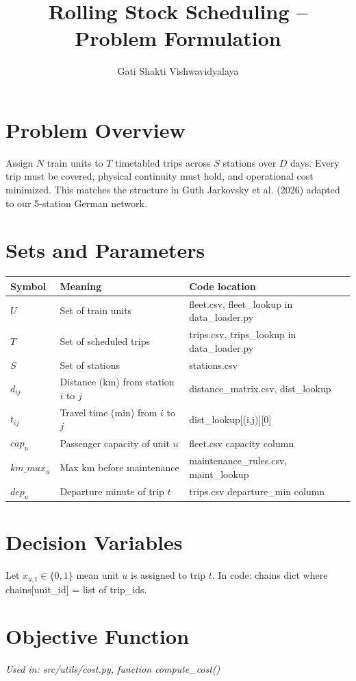 \documentclass{article}
\title{Rolling Stock Scheduling -- Problem Formulation}
\author{Gati Shakti Vishwavidyalaya}
\date{}
\begin{document}
\maketitle

\section{Problem Overview}
Assign $N$ train units to $T$ timetabled trips across $S$ stations over $D$ days.
Every trip must be covered, physical continuity must hold, and operational cost minimized.
This matches the structure in Guth Jarkovsky et al. (2026) adapted to our 5-station German network.

\section{Sets and Parameters}
\begin{tabular}{lll}
\toprule
Symbol & Meaning & Code location \\
\midrule
$U$ & Set of train units & fleet.csv, fleet\_lookup in data\_loader.py \\
$T$ & Set of scheduled trips & trips.csv, trips\_lookup in data\_loader.py \\
$S$ & Set of stations & stations.csv \\
$d_{ij}$ & Distance (km) from station $i$ to $j$ & distance\_matrix.csv, dist\_lookup \\
$t_{ij}$ & Travel time (min) from $i$ to $j$ & dist\_lookup[(i,j)][0] \\
$cap_u$ & Passenger capacity of unit $u$ & fleet.csv capacity column \\
$km\_max_u$ & Max km before maintenance & maintenance\_rules.csv, maint\_lookup \\
$dep_u$ & Departure minute of trip $t$ & trips.csv departure\_min column \\
\bottomrule
\end{tabular}

\section{Decision Variables}
Let $x_{u,t} \in \{0, 1\}$ mean unit $u$ is assigned to trip $t$.
In code: chains dict where chains[unit\_id] = list of trip\_ids.

\section{Objective Function}
\textit{Used in: src/utils/cost.py, function compute\_cost()}
\end{document}
